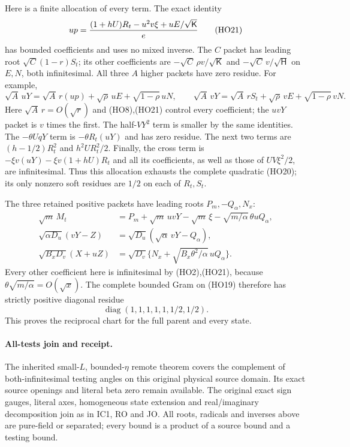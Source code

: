 Here is a finite allocation of every term. The exact identity
\[
 up={(1+hU)R_t-u^2v\xi+uE/\sqrt{\mathsf K}\over e}
 \tag{HO21}
\]
has bounded coefficients and uses no mixed inverse.
The $C$ packet has leading root
$\sqrt C(1-r)S_t$; its other coefficients are
$-\sqrt C\,\rho v/\sqrt{\mathsf K}$ and
$-\sqrt C\,v/\sqrt{\mathsf H}$ on $E,N$, both infinitesimal.
All three $A$ higher packets have zero residue. For example,
\[
 \sqrt A\,uY=\sqrt A\,r(up)+\sqrt\rho\,uE+
                               \sqrt{1-\rho}\,uN,\qquad
 \sqrt A\,vY=\sqrt A\,rS_t+\sqrt\rho\,vE+
                               \sqrt{1-\rho}\,vN .
 \tag{HO22}
\]
Here $\sqrt A\,r=O(\sqrt r)$ and (HO8),(HO21)
control every coefficient; the $uvY$ packet is $v$ times the first.
The half-$VY^2$ term is smaller by the same identities.
The $-\theta UqY$ term is $-\theta R_t(uY)$ and has zero residue.
The next two terms are $(h-1/2)R_t^2$ and
$h^2U R_t^2/2$.
Finally, the cross term is
$-\xi v(uY)-\xi v(1+hU)R_t$ and all its coefficients,
as well as those of $UV\xi^2/2$, are infinitesimal.
Thus this allocation exhausts the complete quadratic (HO20);
its only nonzero soft residues are $1/2$ on each of $R_t,S_t$.

The three retained positive packets have leading roots
$P_m,-Q_\alpha,N_x$:
\[
 \begin{aligned}
 \sqrt m\,M_t&=P_m+\sqrt m\,uvY-\sqrt m\,\xi
                  -\sqrt{m/\alpha}\,\theta uQ_\alpha,\\
 \sqrt{\alpha D_u}(vY-Z)
             &=\sqrt{D_u}(\sqrt\alpha\,vY-Q_\alpha),\\
 \sqrt{B_xD_v}(X+uZ)
             &=\sqrt{D_v}\{N_x+
                      \sqrt{B_x\theta^2/\alpha}\,uQ_\alpha\}.
 \end{aligned}
 \tag{HO23}
\]
Every other coefficient here is infinitesimal by (HO2),(HO21),
because $\theta\sqrt{m/\alpha}=O(\sqrt x)$.
The complete bounded Gram on (HO19) therefore has strictly positive
diagonal residue
\[
             \operatorname{diag}(1,1,1,1,1,1/2,1/2).
 \tag{HO24}
\]
This proves the reciprocal chart for the full parent and every state.

\paragraph{All-tests join and receipt.}
The inherited small-$L$, bounded-$\eta$ remote theorem covers the
complement of both-infinitesimal testing angles on this original
physical source domain. Its exact source openings and literal beta
zero remain available. The original exact sign gauges, literal axes,
homogeneous state extension and real/imaginary decomposition join
as in IC1, RO and JO. All roots, radicals and inverses above are
pure-field or separated; every bound is a product of a source bound
and a testing bound.

